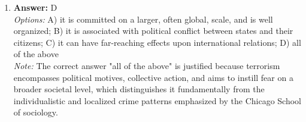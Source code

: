 \documentclass[12pt]{article}
\begin{document}
\begin{enumerate}[label=\arabic*.]
\\ \textit{Options:} A) decreased rates of prostitution and sex tourism; B) developing countries can depend on it as a crucial source of income; C) the exploitation of cheap, unregulated labour in poor countries; D) we have become more aware of 'other' societies and ways of living
\\ \textit{Note:} The correct answer is based on the understanding that global tourism often leads to increased rates of prostitution and sex tourism as destinations cater to the demands of tourists, making it unlikely for these activities to decrease as a consequence of tourism.
\item \textbf{Answer:} D
\\ \textit{Options:} A) it is committed on a larger, often global, scale, and is well organized; B) it is associated with political conflict between states and their citizens; C) it can have far-reaching effects upon international relations; D) all of the above
\\ \textit{Note:} The correct answer "all of the above" is justified because terrorism encompasses political motives, collective action, and aims to instill fear on a broader societal level, which distinguishes it fundamentally from the individualistic and localized crime patterns emphasized by the Chicago School of sociology.
\end{enumerate}
\end{document}
